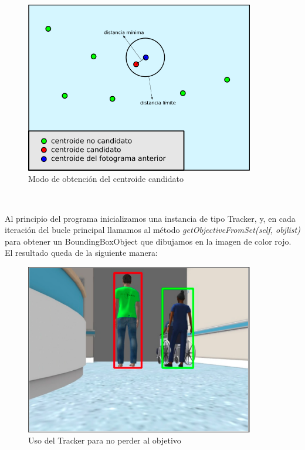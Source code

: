 \begin{figure} [H]
  \begin{center}
    \includegraphics[width=10cm]{imagenes/esquema-tracker.png}
  \end{center}
  \caption[Modo de obtención del centroide candidato]{Modo de obtención del centroide candidato}
  \label{fig:obtencion_centroide}
\end{figure}\

Al principio del programa inicializamos una instancia de tipo Tracker, y, en cada iteración del bucle principal llamamos al método \textit{getObjectiveFromSet(self, objlist)} para obtener un BoundingBoxObject que dibujamos en la imagen de color rojo. El resultado queda de la siguiente manera:\\

\begin{figure} [H]
  \begin{center}
    \includegraphics[width=10cm]{imagenes/aplicando-tracker.png}
  \end{center}
  \caption[Usando el Tracker para no perder al objetivo]{Uso del Tracker para no perder al objetivo}
  \label{fig:uso_tracker}
\end{figure}\


